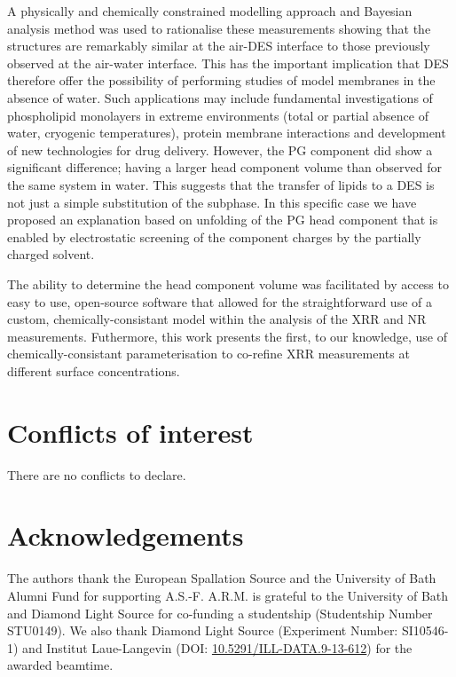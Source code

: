 \documentclass[twoside,twocolumn,9pt]{article}
\renewcommand{\refname}{Notes and references}
\begin{document}
A physically and chemically constrained modelling approach and Bayesian analysis method was used to rationalise these measurements showing that the structures are remarkably similar at the air-DES interface to those previously observed at the air-water interface. This has the important implication that DES therefore offer the possibility of performing studies of model membranes in the absence of water. Such applications may include fundamental investigations of phospholipid monolayers in extreme environments (total or partial absence of water, cryogenic temperatures), protein membrane interactions and development of new technologies for drug delivery. However, the PG component did show a significant difference; having a larger head component volume than observed for the same system in water. This suggests that the transfer of lipids to a DES is not just a simple substitution of the subphase. In this specific case we have proposed an explanation based on unfolding of the PG head component that is enabled by electrostatic screening of the component charges by the partially charged solvent.

The ability to determine the head component volume was facilitated by access to easy to use, open-source software that allowed for the straightforward use of a custom, chemically-consistant model within the analysis of the XRR and NR measurements. Futhermore, this work presents the first, to our knowledge, use of chemically-consistant parameterisation to co-refine XRR measurements at different surface concentrations.

\section*{Conflicts of interest}
There are no conflicts to declare.

\section*{Acknowledgements}
The authors thank the European Spallation Source and the University of Bath Alumni Fund for supporting A.S.-F. A.R.M. is grateful to the University of Bath and Diamond Light Source for co-funding a studentship (Studentship Number STU0149). We also thank Diamond Light Source (Experiment Number: SI10546-1) and Institut Laue-Langevin (DOI: \href{http://doi.org/10.5291/ILL-DATA.9-13-612}{10.5291/ILL-DATA.9-13-612}) for the awarded beamtime.



\balance


\end{document}

